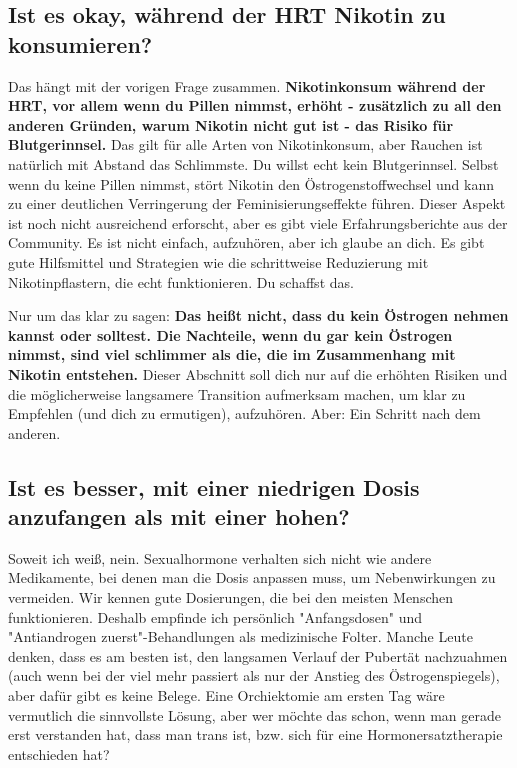 \documentclass{article}
\begin{document}
\subsection{Ist es okay, während der HRT Nikotin zu konsumieren?}\label{11-2}

Das hängt mit der vorigen Frage zusammen. \textbf{Nikotinkonsum während der HRT, vor allem wenn du Pillen nimmst, erhöht - zusätzlich zu all den anderen Gründen, warum Nikotin nicht gut ist - das Risiko für Blutgerinnsel.} Das gilt für alle Arten von Nikotinkonsum, aber Rauchen ist natürlich mit Abstand das Schlimmste. Du willst echt kein Blutgerinnsel. Selbst wenn du keine Pillen nimmst, stört Nikotin den Östrogenstoffwechsel und kann zu einer deutlichen Verringerung der Feminisierungseffekte führen. Dieser Aspekt ist noch nicht ausreichend erforscht, aber es gibt viele Erfahrungsberichte aus der Community. Es ist nicht einfach, aufzuhören, aber ich glaube an dich. Es gibt gute Hilfsmittel und Strategien wie die schrittweise Reduzierung mit Nikotinpflastern, die echt funktionieren. Du schaffst das.

Nur um das klar zu sagen: \textbf{Das heißt nicht, dass du kein Östrogen nehmen kannst oder solltest. Die Nachteile, wenn du gar kein Östrogen nimmst, sind viel schlimmer als die, die im Zusammenhang mit Nikotin entstehen.} Dieser Abschnitt soll dich nur auf die erhöhten Risiken und die möglicherweise langsamere Transition aufmerksam machen, um klar zu Empfehlen (und dich zu ermutigen), aufzuhören. Aber: Ein Schritt nach dem anderen.

\subsection{Ist es besser, mit einer niedrigen Dosis anzufangen als mit einer hohen?}

Soweit ich weiß, nein. Sexualhormone verhalten sich nicht wie andere Medikamente, bei denen man die Dosis anpassen muss, um Nebenwirkungen zu vermeiden. Wir kennen gute Dosierungen, die bei den meisten Menschen funktionieren. Deshalb empfinde ich persönlich "Anfangsdosen" und "Antiandrogen zuerst"-Behandlungen als medizinische Folter. Manche Leute denken, dass es am besten ist, den langsamen Verlauf der Pubertät nachzuahmen (auch wenn bei der viel mehr passiert als nur der Anstieg des Östrogenspiegels), aber dafür gibt es keine Belege. Eine Orchiektomie am ersten Tag wäre vermutlich die sinnvollste Lösung, aber wer möchte das schon, wenn man gerade erst verstanden hat, dass man trans ist, bzw. sich für eine Hormonersatztherapie entschieden hat?
\end{document}
